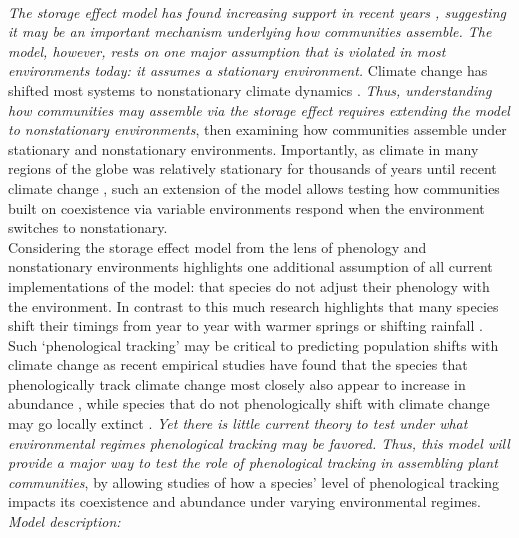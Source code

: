 \documentclass[12pt,a4paper,oneside]{article}
\begin{document}
\vspace{1.5ex}\\
\emph{The storage effect model has found increasing support in recent years \citep{Angert:2009,Levine:2009ym}, suggesting it may be an important mechanism underlying how communities assemble. The model, however, rests on one major assumption that is violated in most environments today: it assumes a stationary environment.} Climate change has shifted most systems to nonstationary climate dynamics \citep{ipcc2013,knutti2013}. \emph{Thus, understanding how communities may assemble via the storage effect requires extending the model to nonstationary environments}, then examining how communities assemble under stationary and nonstationary environments. Importantly, as climate in many regions of the globe was relatively stationary for thousands of years until recent climate change \citep{ipcc2013}, such an extension of the model allows testing how communities built on coexistence via variable environments respond when the environment switches to nonstationary. 
\vspace{1.5ex}\\
Considering the storage effect model from the lens of phenology and nonstationary environments highlights one additional assumption of all current implementations of the model: that species do not adjust their phenology with the environment. In contrast to this much research highlights that many species shift their timings from year to year with warmer springs \citep{tansley} or shifting rainfall \citep{Crimmins:2011lq}. Such `phenological tracking' may be critical to predicting population shifts with climate change as recent empirical studies have found that the species that phenologically track climate change most closely also appear to  increase in abundance \citep{Cleland:2012vn,wolkovichAmBot2013}, while species that do not phenologically shift with climate change may go locally extinct \citep{Willis:2008bf}. \emph{Yet there is little current theory to test under what environmental regimes phenological tracking may be favored. Thus, this model will provide a major way to test the role of phenological tracking in assembling plant communities}, by allowing studies of how a species' level of phenological tracking impacts its coexistence and abundance under varying environmental regimes. 
\vspace{1.5ex}\\
\emph{Model description:} 
\end{document}

